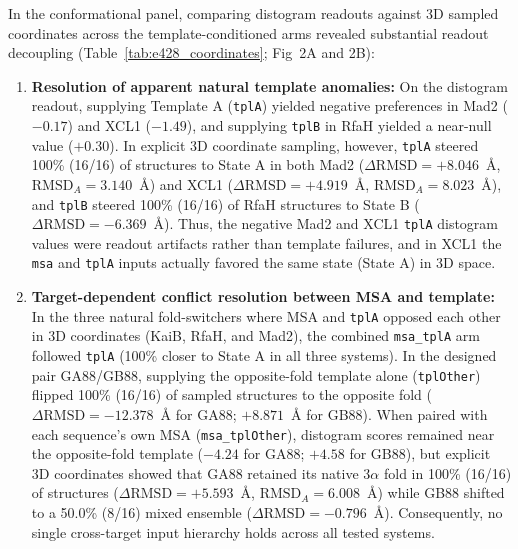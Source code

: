 \documentclass[10pt,a4paper]{article}
\begin{document}
In the conformational panel, comparing distogram readouts against 3D sampled coordinates across the template-conditioned arms revealed substantial readout decoupling (Table~\ref{tab:e428_coordinates}; Fig~2A and 2B):
\begin{enumerate}
    \setlength{\itemsep}{2pt}\setlength{\parskip}{0pt}
    \item \textbf{Resolution of apparent natural template anomalies:} On the distogram readout, supplying Template A (\texttt{tplA}) yielded negative preferences in Mad2 ($-0.17$) and XCL1 ($-1.49$), and supplying \texttt{tplB} in RfaH yielded a near-null value ($+0.30$). In explicit 3D coordinate sampling, however, \texttt{tplA} steered 100\% (16/16) of structures to State A in both Mad2 ($\Delta\mathrm{RMSD} = +8.046$~\AA{}, $\mathrm{RMSD}_A = 3.140$~\AA{}) and XCL1 ($\Delta\mathrm{RMSD} = +4.919$~\AA{}, $\mathrm{RMSD}_A = 8.023$~\AA{}), and \texttt{tplB} steered 100\% (16/16) of RfaH structures to State B ($\Delta\mathrm{RMSD} = -6.369$~\AA{}). Thus, the negative Mad2 and XCL1 \texttt{tplA} distogram values were readout artifacts rather than template failures, and in XCL1 the \texttt{msa} and \texttt{tplA} inputs actually favored the same state (State A) in 3D space.
    \item \textbf{Target-dependent conflict resolution between MSA and template:} In the three natural fold-switchers where MSA and \texttt{tplA} opposed each other in 3D coordinates (KaiB, RfaH, and Mad2), the combined \texttt{msa\_tplA} arm followed \texttt{tplA} (100\% closer to State A in all three systems). In the designed pair GA88/GB88, supplying the opposite-fold template alone (\texttt{tplOther}) flipped 100\% (16/16) of sampled structures to the opposite fold ($\Delta\mathrm{RMSD} = -12.378$~\AA{} for GA88; $+8.871$~\AA{} for GB88). When paired with each sequence's own MSA (\texttt{msa\_tplOther}), distogram scores remained near the opposite-fold template ($-4.24$ for GA88; $+4.58$ for GB88), but explicit 3D coordinates showed that GA88 retained its native $3\alpha$ fold in 100\% (16/16) of structures ($\Delta\mathrm{RMSD} = +5.593$~\AA{}, $\mathrm{RMSD}_A = 6.008$~\AA{}) while GB88 shifted to a 50.0\% (8/16) mixed ensemble ($\Delta\mathrm{RMSD} = -0.796$~\AA{}). Consequently, no single cross-target input hierarchy holds across all tested systems.
\end{enumerate}
\end{document}
